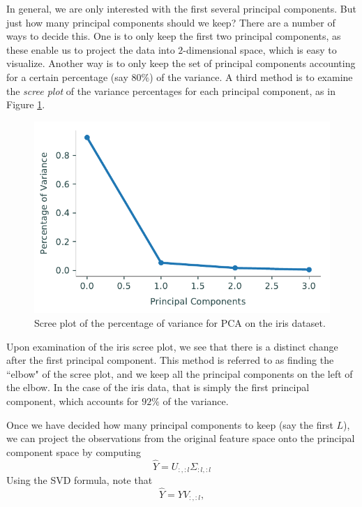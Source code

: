 In general, we are only interested with the first several principal components. But just how many principal components should we keep? There are a number of ways to decide this. One is to only keep the first two principal components, as these enable us to project the data into $2$-dimensional space, which is easy to visualize. Another way is to only keep the set of principal components accounting for a certain percentage (say $80\%$) of the variance. A third method is to examine the \emph{scree plot} of the variance percentages for each principal component, as in Figure \ref{fig:iris_scree}.
\begin{figure}[H]
\includegraphics[width=.7\textwidth]{figures/iris_scree.pdf}
\caption{Scree plot of the percentage of variance for PCA on the iris dataset.}
\label{fig:iris_scree}
\end{figure}
Upon examination of the iris scree plot, we see that there is a distinct change after the first principal component. This method is referred to as finding the ``elbow" of the scree plot, and we keep all the principal components on the left of the elbow. In the case of the iris data, that is simply the first principal component, which accounts for $92\%$ of the variance.

Once we have decided how many principal components to keep (say the first $L$), we can project the observations from the original feature space onto the principal component space by computing
\begin{equation*}
\widehat{Y} = U_{:,:l}\Sigma_{:l,:l}
\end{equation*}
Using the SVD formula, note that
\[
\widehat{Y} = YV_{:,:l},
\]

